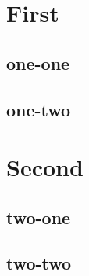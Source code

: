 \documentclass[hourglass]{doctor}
\begin{document}
\section{First}

\subsection{one-one}

\subsection{one-two}

\section{Second}

\subsection{two-one}

\subsection{two-two}
\end{document}
